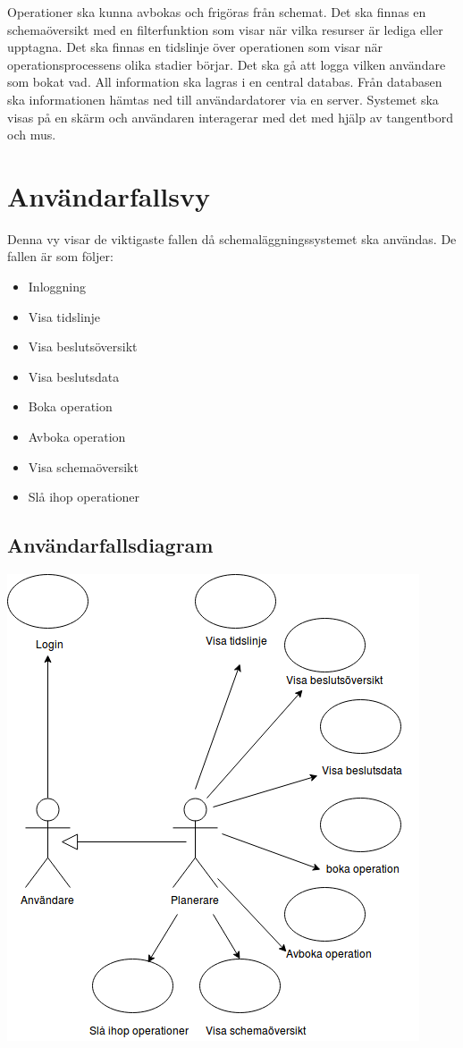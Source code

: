 \documentclass[a4paper,10pt]{article}
\begin{document}
Operationer ska kunna avbokas och frigöras från schemat. Det ska finnas en schemaöversikt med en filterfunktion som visar när vilka resurser är lediga eller upptagna. Det ska finnas en tidslinje över operationen som visar när operationsprocessens olika stadier börjar. Det ska gå att logga vilken användare som bokat vad. All information ska lagras i en central databas. Från databasen ska informationen hämtas ned till användardatorer via en server. Systemet ska visas på en skärm och användaren interagerar med det med hjälp av tangentbord och mus.

\section{Användarfallsvy}

Denna vy visar de viktigaste fallen då schemaläggningssystemet ska användas. De fallen är som följer:
\begin{itemize}
	\item Inloggning
	\item Visa tidslinje
	\item Visa beslutsöversikt
	\item Visa beslutsdata
	\item Boka operation
	\item Avboka operation
	\item Visa schemaöversikt
	\item Slå ihop operationer
\end{itemize}
\subsection{Användarfallsdiagram}
\includegraphics[width=\textwidth,height=\textheight,keepaspectratio]{Usecasediagram.png}
\clearpage
\end{document}
